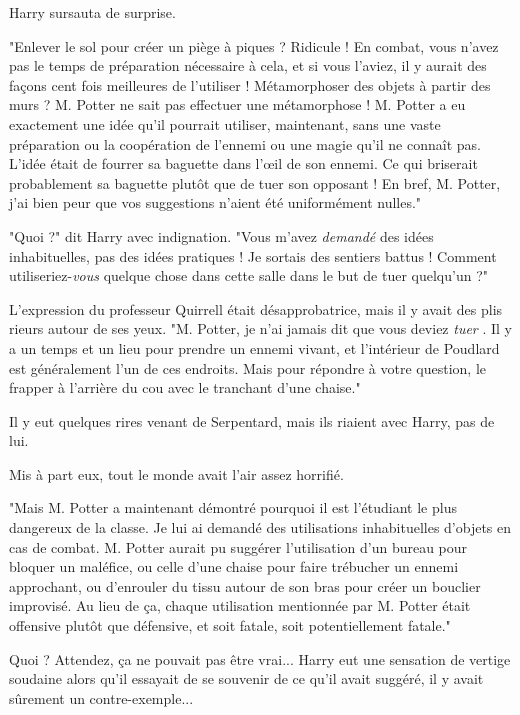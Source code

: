 Harry sursauta de surprise.

"Enlever le sol pour créer un piège à piques ? Ridicule ! En combat, vous n'avez pas le temps de préparation nécessaire à cela, et si vous l'aviez, il y aurait des façons cent fois meilleures de l'utiliser ! Métamorphoser des objets à partir des murs ? M. Potter ne sait pas effectuer une métamorphose ! M. Potter a eu exactement une idée qu'il pourrait utiliser, maintenant, sans une vaste préparation ou la coopération de l'ennemi ou une magie qu'il ne connaît pas. L'idée était de fourrer sa baguette dans l'œil de son ennemi. Ce qui briserait probablement sa baguette plutôt que de tuer son opposant ! En bref, M. Potter, j'ai bien peur que vos suggestions n'aient été uniformément nulles."

"Quoi ?" dit Harry avec indignation. "Vous m'avez \emph{demandé}  des idées inhabituelles, pas des idées pratiques ! Je sortais des sentiers battus ! Comment utiliseriez-\emph{vous}  quelque chose dans cette salle dans le but de tuer quelqu'un ?"

L'expression du professeur Quirrell était désapprobatrice, mais il y avait des plis rieurs autour de ses yeux. "M. Potter, je n'ai jamais dit que vous deviez \emph{tuer} . Il y a un temps et un lieu pour prendre un ennemi vivant, et l'intérieur de Poudlard est généralement l'un de ces endroits. Mais pour répondre à votre question, le frapper à l'arrière du cou avec le tranchant d'une chaise."

Il y eut quelques rires venant de Serpentard, mais ils riaient avec Harry, pas de lui.

Mis à part eux, tout le monde avait l'air assez horrifié.

"Mais M. Potter a maintenant démontré pourquoi il est l'étudiant le plus dangereux de la classe. Je lui ai demandé des utilisations inhabituelles d'objets en cas de combat. M. Potter aurait pu suggérer l'utilisation d'un bureau pour bloquer un maléfice, ou celle d'une chaise pour faire trébucher un ennemi approchant, ou d'enrouler du tissu autour de son bras pour créer un bouclier improvisé. Au lieu de ça, chaque utilisation mentionnée par M. Potter était offensive plutôt que défensive, et soit fatale, soit potentiellement fatale."

Quoi ? Attendez, ça ne pouvait pas être vrai... Harry eut une sensation de vertige soudaine alors qu'il essayait de se souvenir de ce qu'il avait suggéré, il y avait sûrement un contre-exemple...

